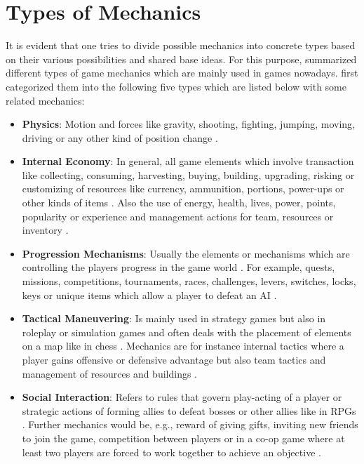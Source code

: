 \documentclass[MGS,Master,english]{twbook}%
\begin{document}
\section{Types of Mechanics}
It is evident that one tries to divide possible mechanics into concrete types based on their various possibilities and shared base ideas. For this purpose, \citep{gameDesign::gameMechanicsAdvancedGameDesign} summarized different types of game mechanics which are mainly used in games nowadays.  first categorized them into the following five types which are listed below with some related mechanics:
\begin{itemize}
	\item \textbf{Physics}: Motion and forces like gravity, shooting, fighting, jumping, moving, driving or any other kind of position change \cite{gameDesign::gameMechanicsAdvancedGameDesign}. 
	\item \textbf{Internal Economy}: In general, all game elements which involve transaction like collecting, consuming, harvesting, buying, building, upgrading, risking or customizing of resources like currency, ammunition, portions, power-ups or other kinds of items \cite{gameDesign::gameMechanicsAdvancedGameDesign}. Also the use of energy, health, lives, power, points, popularity or experience and management actions for team, resources or inventory
	\cite{gameDesign::gameMechanicsAdvancedGameDesign}.
	\item \textbf{Progression Mechanisms}: Usually the elements or mechanisms which are controlling the players progress in the game world \cite{gameDesign::gameMechanicsAdvancedGameDesign}. For example, quests, missions, competitions, tournaments, races, challenges, levers, switches, locks, keys or unique items which allow a player to defeat an \ac{AI} \cite{gameDesign::gameMechanicsAdvancedGameDesign}.
	\item \textbf{Tactical Maneuvering}: Is mainly used in strategy games but also in roleplay or simulation games and often deals with the placement of elements on a map like in chess \cite{gameDesign::gameMechanicsAdvancedGameDesign}. Mechanics are for instance internal tactics where a player gains offensive or defensive advantage but also team tactics and management of resources and buildings \cite{gameDesign::gameMechanicsAdvancedGameDesign}.
	\item \textbf{Social Interaction}: Refers to rules that govern play-acting of a player or strategic actions of forming allies to defeat bosses or other allies like in \acp{RPG} \cite{gameDesign::gameMechanicsAdvancedGameDesign}. Further mechanics would be, e.g., reward of giving gifts, inviting new friends to join the game, competition between players or in a co-op game where at least two players are forced to work together to achieve an objective \cite{gameDesign::gameMechanicsAdvancedGameDesign}.
\end{itemize}
\end{document}
